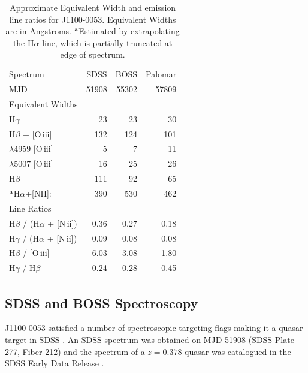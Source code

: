 \documentclass[a4paper,fleqn,usenatbib]{mnras}
\begin{document}
{\bf 
  \begin{table}
    \centering
    \begin{tabular}{l r r r}
      \hline \hline 
       Spectrum                                                        &	SDSS  &	BOSS    &	Palomar\\
      MJD                                                                  &    51908 &  55302  &    57809          \\              
      \hline   
       Equivalent Widths & & & \\   
     H$\gamma$                                                       &    23       &   23    &    30 \\
      H$\beta$ +  [O\,{\sc iii}]                                   &  132       & 124    &  101 \\
        $\lambda$4959 [O\,{\sc iii}]                           &      5       &     7    &   11 \\
         $\lambda$5007 [O\,{\sc iii}]                          &    16      &  25 &     26\\
      H$\beta$                                                           &  111     &   92   &    65\\
     $^{{\rm a}}$H$\alpha$+[NII]:                                 &  390     &  530    &   462\\
      \hline   
      Line Ratios  & & & \\
      H$\beta$      / (H$\alpha$ + [N\,{\sc ii}])   &  0.36    &  0.27   &  0.18 \\
      H$\gamma$ / (H$\alpha$ + [N\,{\sc ii}])   &  0.09    &  0.08   &  0.08 \\
      H$\beta$      / [O\,{\sc iii}]   	                  &  6.03    &  3.08   &  1.80  \\ 
      H$\gamma$ / H$\beta$      	                  &  0.24    &  0.28   &  0.45 \\
      \hline \hline 
  \end{tabular}
      \caption{Approximate Equivalent Width and emission line ratios for J1100-0053.
        Equivalent Widths are in Angstroms. 
        $^{{\rm a}}$Estimated by extrapolating the H$\alpha$ line, which is partially truncated at edge of spectrum.} 
      \label{tab:line_ratios}
\end{table}
}
\subsection{SDSS and BOSS Spectroscopy}
J1100-0053 satisfied a number of spectroscopic targeting flags making
it a quasar target in SDSS \citep{Richards2002}. An SDSS spectrum was
obtained on MJD 51908 (SDSS Plate 277, Fiber 212) and the spectrum of
a $z=0.378$ quasar was catalogued in the SDSS Early Data Release
\citep{Stoughton2002, Schneider2002}.
\end{document}
